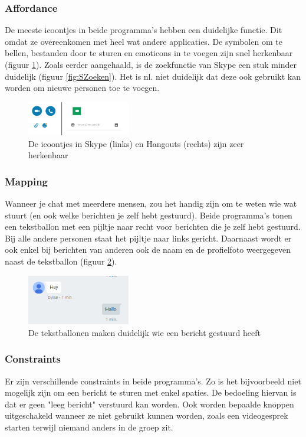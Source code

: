 \documentclass[11pt]{article}
\begin{document}
\subsubsection{Affordance}
De meeste icoontjes in beide programma's hebben een duidelijke functie. Dit omdat ze overeenkomen met heel wat andere applicaties. De symbolen om te bellen, bestanden door te sturen en emoticons in te voegen zijn snel herkenbaar (figuur \ref{fig:SHIcoontjes}). Zoals eerder aangehaald, is de zoekfunctie van Skype een stuk minder duidelijk (figuur \ref{fig:SZoeken}). Het is nl. niet duidelijk dat deze ook gebruikt kan worden om nieuwe personen toe te voegen. 
\begin{figure}
	\centering
	\includegraphics[width=0.4\textwidth]{Dylan_SHIcoontjes.png}
	\caption{De icoontjes in Skype (links) en Hangouts (rechts) zijn zeer herkenbaar}
	\label{fig:SHIcoontjes}
\end{figure}
\subsubsection{Mapping}
Wanneer je chat met meerdere mensen, zou het handig zijn om te weten wie wat stuurt (en ook welke berichten je zelf hebt gestuurd). Beide programma's tonen een tekstballon met een pijltje naar recht voor berichten die je zelf hebt gestuurd. Bij alle andere personen staat het pijltje naar links gericht. Daarnaast wordt er ook enkel bij berichten van anderen ook de naam en de profielfoto weergegeven naast de tekstballon (figuur \ref{fig:HChat}).
\begin{figure}
	\centering
	\includegraphics[width=0.4\textwidth]{Dylan_HChat.png}
	\caption{De tekstballonen maken duidelijk wie een bericht gestuurd heeft}
	\label{fig:HChat}
\end{figure}
\subsubsection{Constraints}
Er zijn verschillende constraints in beide programma's. Zo is het bijvoorbeeld niet mogelijk zijn om een bericht te sturen met enkel spaties. De bedoeling hiervan is dat er geen "leeg bericht" verstuurd kan worden. Ook worden bepaalde knoppen uitgeschakeld wanneer ze niet gebruikt kunnen worden, zoals een videogesprek starten terwijl niemand anders in de groep zit.
\end{document}
